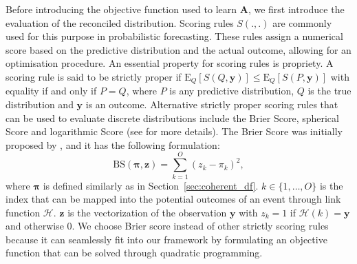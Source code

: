 \documentclass[a4paper,review,12pt,authoryear]{elsarticle}
\newcommand{\bpi}{\bm{\pi}}
\theoremstyle{definition}
\begin{document}
    Before introducing the objective function used to learn $\bm{A}$, we first introduce the evaluation of the reconciled distribution.
    Scoring rules $S(.,.)$ are commonly used for this purpose in probabilistic forecasting.
    These rules assign a numerical score based on the predictive distribution and the actual outcome, allowing for an optimisation procedure.
    An essential property for scoring rules is propriety. A scoring rule is said to be strictly proper if $\text{E}_Q[S(Q, \mathbf{y})] \leq \text{E}_Q[S(P, \mathbf{y})]$ with equality if and only if $P=Q$, where $P$ is any predictive distribution, $Q$ is the true distribution and $\mathbf{y}$ is an outcome.
    Alternative strictly proper scoring rules that can be used to evaluate discrete distributions include the Brier Score, spherical Score and logarithmic Score (see \citealp{gneitingStrictlyProperScoring2007} for more details).
    The Brier Score was initially proposed by \cite{brier1950verification}, and it has the following formulation:
    \[
      \text{BS}(\bpi, \mathbf{z}) = \sum_{k=1}^{O}(z_k - \pi_k)^2,
    \] where $\bpi$ is defined similarly as in Section~\ref{sec:coherent_df}.
    $k\in \{1,\dots,O\}$ is the index that can be mapped into the potential outcomes of an event through link function $\mathcal{H}$. $\mathbf{z}$ is the vectorization of the observation $\mathbf{y}$ with $z_k = 1$ if $\mathcal{H}(k) = \mathbf{y}$ and otherwise $0$.
    We choose Brier score instead of other strictly scoring rules because it can seamlessly fit into our framework by formulating an objective function that can be solved through quadratic programming.
\end{document}
